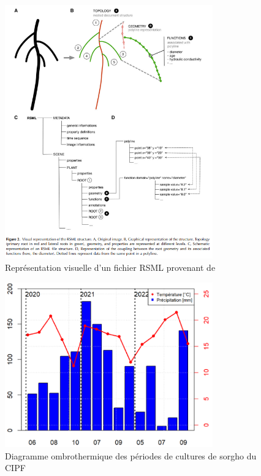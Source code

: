 \label{an:RSML}
\begin{figure}[ht]
\centering
\includegraphics[width=0.8\textwidth]{Image/RSML.png}
\caption{Représentation visuelle d'un fichier RSML provenant de \cite{lobet_root_2015}}
\end{figure}

\newpage

\label{an:aerial}
\begin{figure}[ht]
\centering
\includegraphics[width=0.8\textwidth]{Image/ombrothermique.png}
\caption{Diagramme ombrothermique des périodes de cultures de sorgho du CIPF}
\end{figure}

